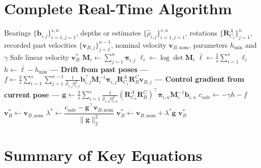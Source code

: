 \documentclass[11pt,a4paper]{article}
\begin{document}
\section{Complete Real-Time Algorithm}

\begin{algorithm}[H]
\caption{CBF-QP Safety Filter Using the Average Multi-Feature Log-Det Metric}
\label{alg:cbf_average}
\begin{algorithmic}[1]
\Require Bearings $\{\bm{b}_{i,j}\}_{i=1,j=1}^{s,n}$, depths or estimates
$\{\hat{\rho}_{i,j}\}_{i=1,j=1}^{s,n}$, rotations
$\{\bm{R}_{C_j}^{A}\}_{j=1}^{n}$, recorded past velocities
$\{\bm{v}_{B,j}\}_{j=1}^{n-1}$, nominal velocity
$\bm{v}_{B,\mathrm{nom}}$, parameters $h_{\min}$ and $\gamma$
\Ensure Safe linear velocity $\bm{v}_{B}^{*}$
  \State $\bm{M}_{i}\leftarrow\sum_{j=1}^{n}\bm{\pi}_{i,j}$
  \State $\ell_i\leftarrow\log\det\bm{M}_{i}$
\EndFor
\State $\bar{\ell}\leftarrow\frac{1}{s}\sum_{i=1}^{s}\ell_i$
\State $h\leftarrow\bar{\ell}-h_{\min}$
\State \textbf{--- Drift from past poses ---}
\State $f\leftarrow
\frac{2}{s}\sum_{i=1}^{s}\sum_{j=1}^{n-1}
\frac{1}{\hat{\rho}_{i,j}\eta_{i,j}^{2}}
\bm{b}_{i,j}^{\top}\bm{M}_{i}^{-1}\bm{\pi}_{i,j}
\bm{R}_{C_j}^{A}\bm{R}_{B}^{C}\bm{v}_{B,j}$
\State \textbf{--- Control gradient from current pose ---}
\State $\bm{g}\leftarrow
\frac{2}{s}\sum_{i=1}^{s}
\frac{1}{\hat{\rho}_{i,n}\eta_{i,n}^{2}}
(\bm{R}_{C_n}^{A}\bm{R}_{B}^{C})^{\top}
\bm{\pi}_{i,n}\bm{M}_{i}^{-1}\bm{b}_{i,n}$
\State $c_{\mathrm{safe}}\leftarrow-\gamma h - f$
  \State $\bm{v}_{B}^{*}\leftarrow\bm{v}_{B,\mathrm{nom}}$
\Else
  \State $\lambda^{*}\leftarrow
  \dfrac{c_{\mathrm{safe}}-\bm{g}^{\top}\bm{v}_{B,\mathrm{nom}}}
  {\|\bm{g}\|_{2}^{2}}$
  \State $\bm{v}_{B}^{*}\leftarrow\bm{v}_{B,\mathrm{nom}}+\lambda^{*}\bm{g}$
\EndIf
\State \Return $\bm{v}_{B}^{*}$
\end{algorithmic}
\end{algorithm}

\section{Summary of Key Equations}
\end{document}
